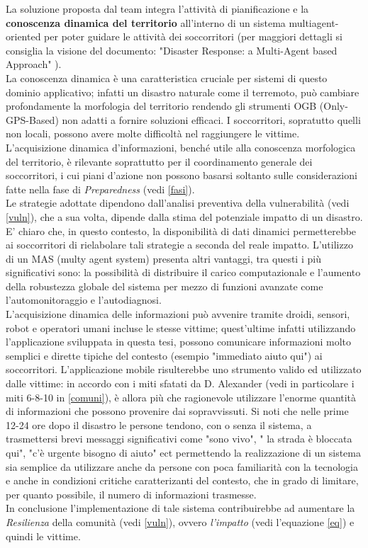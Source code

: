 La soluzione proposta dal team integra l'attività di pianificazione e la \textbf{conoscenza dinamica del territorio} all'interno di un sistema multiagent-oriented per poter guidare le attività dei soccorritori (per maggiori dettagli si consiglia la visione del documento: "Disaster Response: a Multi-Agent based Approach" \cite{RESPONSE}).\\
La conoscenza dinamica è una caratteristica cruciale per sistemi di questo dominio applicativo; infatti un disastro naturale come il terremoto, può cambiare profondamente la morfologia del territorio rendendo gli strumenti OGB (Only-GPS-Based) non adatti a fornire soluzioni efficaci. I soccorritori, sopratutto quelli non locali, possono avere molte difficoltà nel raggiungere le vittime.
\newpage
L'acquisizione dinamica d'informazioni, benché utile alla conoscenza morfologica del territorio, è rilevante soprattutto per il coordinamento generale dei soccorritori, i cui piani d'azione non possono basarsi soltanto sulle considerazioni fatte nella fase di \textit{Preparedness} (vedi \ref{fasi}).\\
 Le strategie adottate dipendono dall'analisi preventiva della vulnerabilità (vedi \ref{vuln}), che a sua volta, dipende dalla stima del potenziale impatto di un disastro.\\
 E' chiaro che, in questo contesto, la disponibilità di dati dinamici permetterebbe ai soccorritori di rielabolare tali strategie a seconda del reale impatto. 
L'utilizzo di un MAS (multy agent system) presenta altri vantaggi, tra questi i più significativi sono: la possibilità di distribuire il carico computazionale e l'aumento della robustezza globale del sistema per mezzo di funzioni avanzate come l'automonitoraggio e l'autodiagnosi.\\
L'acquisizione dinamica delle informazioni può avvenire tramite droidi, sensori, robot e operatori umani incluse le stesse vittime; quest'ultime infatti utilizzando l'applicazione sviluppata in questa tesi, possono comunicare informazioni molto semplici e dirette tipiche del contesto (esempio "immediato aiuto qui") ai soccorritori. L'applicazione mobile risulterebbe uno strumento valido ed utilizzato dalle vittime: in accordo con i miti sfatati da D. Alexander (vedi in particolare i miti 6-8-10 in \ref{comuni}), è allora più che ragionevole utilizzare l'enorme quantità di informazioni che possono provenire dai sopravvissuti. Si noti che nelle prime 12-24 ore dopo il disastro le persone tendono, con o senza il sistema, a trasmettersi brevi messaggi significativi come "sono vivo", " la strada è bloccata qui", "c'è urgente bisogno di aiuto" ect permettendo la realizzazione di un sistema sia semplice da utilizzare anche da persone con poca familiarità con la tecnologia e anche in condizioni critiche caratterizanti del contesto, che in grado di limitare, per quanto possibile, il numero di informazioni trasmesse.\\
 In conclusione l'implementazione di tale sistema contribuirebbe ad aumentare la \textit{Resilienza} della comunità (vedi \ref{vuln}), ovvero \textit{l'impatto} (vedi l'equazione \ref{eq}) e quindi le vittime. 